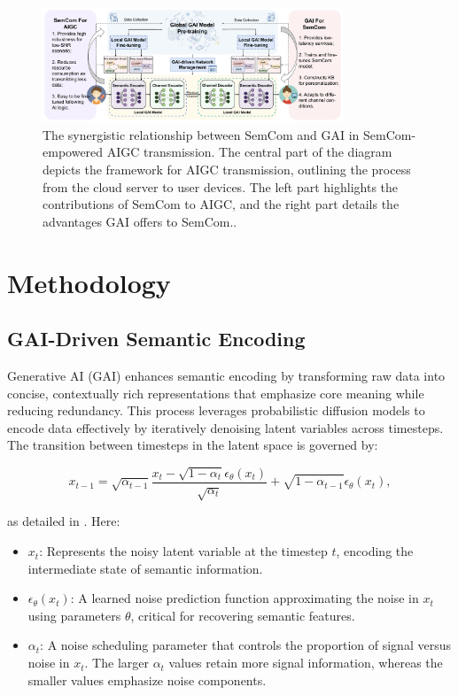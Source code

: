 \documentclass[journal]{IEEEtran}
\begin{document}
\begin{figure}[htbp]
    \centering
    \includegraphics[width=0.8\textwidth]{2.png}
    \caption{The synergistic relationship between SemCom and GAI in SemCom-empowered AIGC transmission. The central part of the diagram depicts the framework for AIGC transmission, outlining the process from the cloud server to user devices. The left part highlights the contributions of SemCom to AIGC, and the right part details the advantages GAI offers to SemCom.\cite{10614204}.}
    \label{fig:synergistic_relationship}
\end{figure}

\section{Methodology}

\subsection{GAI-Driven Semantic Encoding}
Generative AI (GAI) enhances semantic encoding by transforming raw data into concise, contextually rich representations that emphasize core meaning while reducing redundancy. This process leverages probabilistic diffusion models to encode data effectively by iteratively denoising latent variables across timesteps. The transition between timesteps in the latent space is governed by:

\begin{equation}
x_{t-1} = \sqrt{\alpha_{t-1}} \frac{x_t - \sqrt{1 - \alpha_t} \epsilon_\theta (x_t)}{\sqrt{\alpha_t}} + \sqrt{1 - \alpha_{t-1}} \epsilon_\theta (x_t),
\end{equation}

as detailed in \cite{10447237}. Here:
\begin{itemize}
    \item \( x_t \): Represents the noisy latent variable at the timestep \( t \), encoding the intermediate state of semantic information.
    \item \( \epsilon_\theta(x_t) \): A learned noise prediction function approximating the noise in \( x_t \) using parameters \( \theta \), critical for recovering semantic features.
    \item \( \alpha_t \): A noise scheduling parameter that controls the proportion of signal versus noise in \( x_t \). The larger \( \alpha_t \) values retain more signal information, whereas the smaller values emphasize noise components.
\end{itemize}
\end{document}
